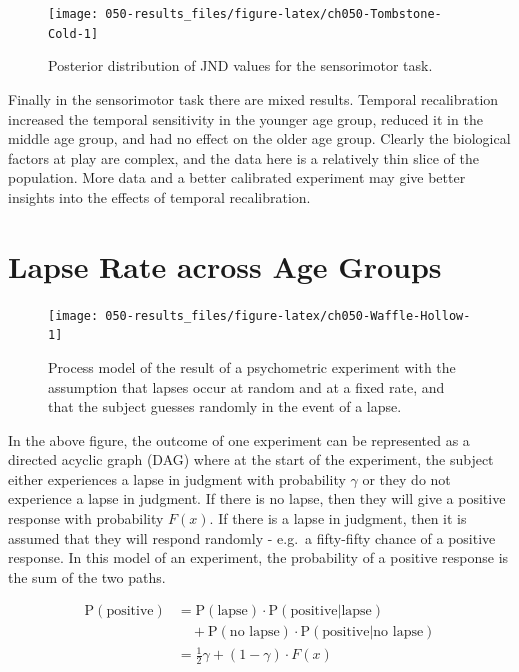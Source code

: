 \documentclass[11pt, oneside, openany]{scrbook}
\begin{document}
\begin{figure}

{\centering \texttt{[image: 050-results\_files/figure-latex/ch050-Tombstone-Cold-1]} 

}

\caption{Posterior distribution of JND values for the sensorimotor task.}\label{fig:ch050-Tombstone-Cold}
\end{figure}

Finally in the sensorimotor task there are mixed results. Temporal recalibration increased the temporal sensitivity in the younger age group, reduced it in the middle age group, and had no effect on the older age group. Clearly the biological factors at play are complex, and the data here is a relatively thin slice of the population. More data and a better calibrated experiment may give better insights into the effects of temporal recalibration.

\hypertarget{lapse-rate-across-age-groups}{%
\section{Lapse Rate across Age Groups}\label{lapse-rate-across-age-groups}}

\begin{figure}

{\centering \texttt{[image: 050-results\_files/figure-latex/ch050-Waffle-Hollow-1]} 

}

\caption{Process model of the result of a psychometric experiment with the assumption that lapses occur at random and at a fixed rate, and that the subject guesses randomly in the event of a lapse.}\label{fig:ch050-Waffle-Hollow}
\end{figure}

In the above figure, the outcome of one experiment can be represented as a directed acyclic graph (DAG) where at the start of the experiment, the subject either experiences a lapse in judgment with probability \(\gamma\) or they do not experience a lapse in judgment. If there is no lapse, then they will give a positive response with probability \(F(x)\). If there is a lapse in judgment, then it is assumed that they will respond randomly - e.g.~a fifty-fifty chance of a positive response. In this model of an experiment, the probability of a positive response is the sum of the two paths.

\begin{align*}
\mathrm{P}(\textrm{positive}) &= 
  \mathrm{P}(\textrm{lapse}) \cdot \mathrm{P}(\textrm{positive} | \textrm{lapse}) \\
  &\quad + \mathrm{P}(\textrm{no lapse}) \cdot \mathrm{P}(\textrm{positive} | \textrm{no lapse}) \\
  &= \frac{1}{2} \gamma + (1 - \gamma) \cdot F(x)
\end{align*}
\end{document}
